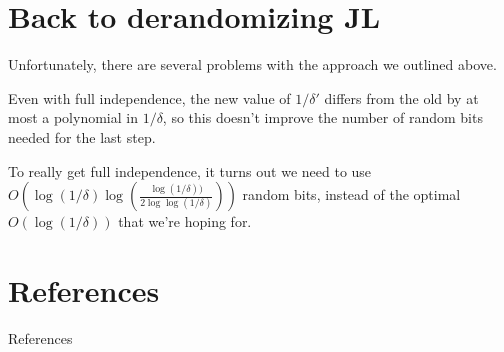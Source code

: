 \documentclass[10pt]{beamer}
\renewcommand{\l}{\left}
\renewcommand{\r}{\right}
\begin{document}

\section{Back to derandomizing JL}
\label{sec:}

\begin{frame}
  \sectionpage
\end{frame}

\begin{frame}
  Unfortunately, there are several problems with the approach we
    outlined above.

  \pause\bigskip\bigskip

  Even with full independence, the new value of $1/\delta'$ differs
  from the old by at most a polynomial in $1/\delta$, so this doesn't
  improve the number of random bits needed for the last step.

  \pause\bigskip\bigskip

  To really get full independence, it turns out we need to use
  $O\l(\log(1/\delta)
  \log\l(\frac{\log(1/\delta))}{2\log\log(1/\delta)}\r)\r)$ random
  bits, instead of the optimal $O(\log(1/\delta))$ that we're hoping
  for.
\end{frame}



\section{References}

\begin{frame}[allowframebreaks]{References}
\nocite{*}


\end{frame}

\end{document}

